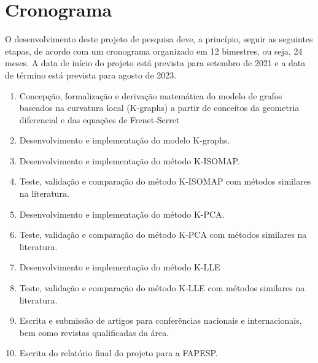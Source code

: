 \documentclass[a4paper,12pt]{article}
\begin{document}
\section{Cronograma}

O desenvolvimento deste projeto de pesquisa deve, a princípio, seguir as seguintes etapas, de acordo com um cronograma organizado em 12 bimestres, ou seja, 24 meses. A data de início do projeto está prevista para setembro de 2021 e a data de término está prevista para agosto de 2023.

\begin{enumerate}
	\item Concepção, formalização e derivação matemática do modelo de grafos baseados na curvatura local (K-graphs) a partir de conceitos da geometria diferencial e das equações de Frenet-Serret
	\item Desenvolvimento e implementação do modelo K-graphs.
	\item Desenvolvimento e implementação do método K-ISOMAP.
	\item Teste, validação e comparação do método K-ISOMAP com métodos similares na literatura.
	\item Desenvolvimento e implementação do método K-PCA.
	\item Teste, validação e comparação do método K-PCA com métodos similares na literatura.
	\item Desenvolvimento e implementação do método K-LLE
	\item Teste, validação e comparação do método K-LLE com métodos similares na literatura.
	\item Escrita e submissão de artigos para conferências nacionais e internacionais, bem como revistas qualificadas da área.
	\item Escrita do relatório final do projeto para a FAPESP.
\end{enumerate}
\end{document}
